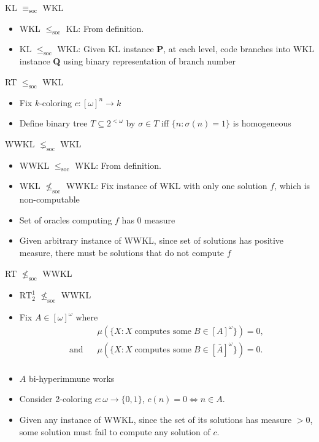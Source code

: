\documentclass[notes]{beamer}
\begin{document}
\begin{frame}{KL $\equiv_{\text{soc}}$ WKL}
  \begin{itemize}
    \item WKL $\leq_{\text{soc}}$ KL: From definition.
    \item KL $\leq_{\text{soc}}$ WKL: Given KL instance \textbf{P}, at
      each level, code branches into WKL instance \textbf{Q} using binary
      representation of branch number
  \end{itemize}
\end{frame}

\begin{frame}{RT $\leq_{\text{soc}}$ WKL}
  \begin{itemize}
    \item Fix $k$-coloring $c:[\omega]^n\rightarrow k$
    \item Define binary tree $T\subseteq 2^{<\omega}$ by $\sigma\in T$
      iff $\{n:\sigma(n)=1\}$ is homogeneous
  \end{itemize}
\end{frame}

\begin{frame}{WWKL $\lneq_{\text{soc}}$ WKL}
  \begin{itemize}
    \item WWKL $\leq_{\text{soc}}$ WKL: From definition.
    \item WKL $\nleq_{\text{soc}}$ WWKL: Fix instance of WKL with only one
      solution $f$, which is non-computable
    \item Set of oracles computing $f$ has 0 measure
    \item Given arbitrary instance of WWKL, since set of solutions has
      positive measure, there must be solutions that do not compute $f$ 
  \end{itemize}
\end{frame}

\begin{frame}{RT $\nleq_{\text{soc}}$ WWKL}
  \begin{itemize}
    \item $\text{RT}_2^1$ $\nleq_{\text{soc}}$ WWKL
    \item Fix $A\in[\omega]^\omega$ where
      \begin{align*}
        &\mu(\{X: X\; \text{computes some}\; B\in[A]^\omega\}) =0,\\
        \text{and}\;\;\; &\mu(\{X: X\; \text{computes some}\;
        B\in[\bar{A}]^\omega\}) =0.\\
      \end{align*}
    \item $A$ bi-hyperimmune works
    \item Consider 2-coloring $c:\omega\rightarrow\{0,1\}$, $c(n)=0
      \Leftrightarrow n\in A$.
    \item Given any instance of WWKL, since the set of its solutions has
      measure $>0$, some solution must fail to compute any solution of $c$.
  \end{itemize}
\end{frame}
\end{document}
